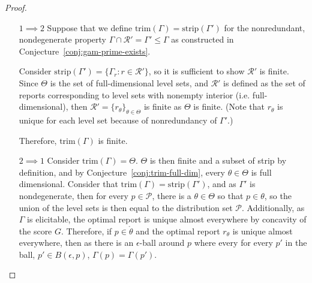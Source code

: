 \documentclass[12pt]{article}
\renewcommand{\P}{\mathcal{P}}
\newcommand{\R}{\mathcal{R}}
\newcommand{\inter}[1]{\mathring{#1}}%
\newcommand{\trim}{\mathrm{trim}}
\newcommand{\strip}{\mathrm{strip}}
\begin{document}
\begin{proof}
\begin{enumerate}
\item [$1 \implies 2$]
Suppose that we define $\trim(\Gamma) = \strip(\Gamma')$ for the nonredundant, nondegenerate property $\Gamma \cap \R' = \Gamma' \leq \Gamma$ as constructed in Conjecture~\ref{conj:gam-prime-exists}.

Consider $\strip(\Gamma') = \{\Gamma_r : r \in \R'\}$, so it is sufficient to show $\R'$ is finite.
Since $\Theta$ is the set of full-dimensional level sets, and $\R'$ is defined as the set of reports corresponding to level sets with nonempty interior (i.e. full-dimensional), then $\R' = \{r_\theta\}_{\theta \in \Theta}$ is finite as $\Theta$ is finite.
(Note that $r_\theta$ is unique for each level set because of nonredundancy of $\Gamma'$.)

Therefore, $\trim(\Gamma)$ is finite.

\item [$2 \implies 1$]
Consider $\trim(\Gamma) = \Theta$.
$\Theta$ is then finite and a subset of strip by definition, and by Conjecture~\ref{conj:trim-full-dim}, every $\theta \in \Theta$ is full dimensional.
Consider that $\trim(\Gamma) = \strip(\Gamma')$, and as $\Gamma'$ is nondegenerate, then for every $p \in \P$, there is a $\theta \in \Theta$ so that $p \in \theta$, so the union of the level sets is then equal to the distribution set $\P$.
Additionally, as $\Gamma$ is elicitable, the optimal report is unique almost everywhere by concavity of the score $G$.
Therefore, if $p \in \inter{\theta}$ and the optimal report $r_\theta$ is unique almost everywhere, then as there is an $\epsilon$-ball around $p$ where every for every $p'$ in the ball, $p' \in B(\epsilon, p)$, $\Gamma(p) = \Gamma(p')$.


\end{enumerate}
\end{proof}
\end{document}

